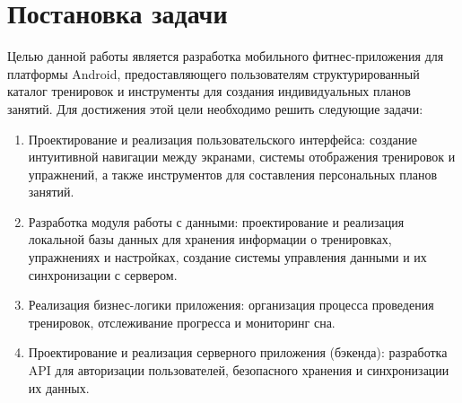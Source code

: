 \section{Постановка задачи}

Целью данной работы является разработка мобильного фитнес-приложения для платформы Android, предоставляющего пользователям структурированный каталог тренировок и инструменты для создания индивидуальных планов занятий. Для достижения этой цели необходимо решить следующие задачи:

\begin{enumerate}
	\item Проектирование и реализация пользовательского интерфейса: создание интуитивной навигации между экранами, системы отображения тренировок и упражнений, а также инструментов для составления персональных планов занятий.

	\item Разработка модуля работы с данными: проектирование и реализация локальной базы данных для хранения информации о тренировках, упражнениях и настройках, создание системы управления данными и их синхронизации с сервером.

	\item Реализация бизнес-логики приложения: организация процесса проведения тренировок, отслеживание прогресса и мониторинг сна.

	\item Проектирование и реализация серверного приложения (бэкенда): разработка API для авторизации пользователей, безопасного хранения и синхронизации их данных.
\end{enumerate}
